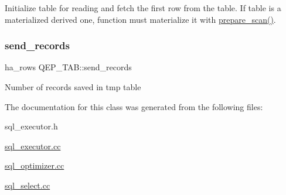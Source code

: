 Initialize table for reading and fetch the first row from the table. If table is a materialized derived one, function must materialize it with \mbox{\hyperlink{group__Query__Executor_ga0f7e9ff5a681a6bcc59e6e1f9af62b76}{prepare\+\_\+scan()}}. \mbox{\label{classQEP__TAB_ae98307c110eb577934f1da5a6d4f3aaa}} 
\subsubsection{\texorpdfstring{send\+\_\+records}{send\_records}}
{\footnotesize\ttfamily ha\+\_\+rows Q\+E\+P\+\_\+\+T\+A\+B\+::send\+\_\+records}

Number of records saved in tmp table 

The documentation for this class was generated from the following files\+:\begin{DoxyCompactItemize}
\item 
sql\+\_\+executor.\+h\item 
\mbox{\hyperlink{sql__executor_8cc}{sql\+\_\+executor.\+cc}}\item 
\mbox{\hyperlink{sql__optimizer_8cc}{sql\+\_\+optimizer.\+cc}}\item 
\mbox{\hyperlink{sql__select_8cc}{sql\+\_\+select.\+cc}}\end{DoxyCompactItemize}
